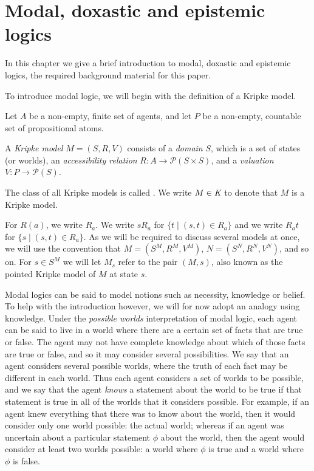 \chapter{Modal, doxastic and epistemic logics}\label{modal}

In this chapter we give a brief introduction to modal, doxastic and epistemic
logics, the required background material for this paper.

To introduce modal logic, we will begin with the definition of a Kripke model.

Let $A$ be a non-empty, finite set of agents, and let $P$ be a non-empty,
countable set of propositional atoms.

\begin{definition}
A \textit{Kripke model} $M = (S, R, V)$ consists of a \textit{domain} $S$, which
is a set of states (or worlds), an \textit{accessibility relation} $R : A \to
\mathcal{P}(S \times S)$, and a \textit{valuation} $V : P \to \mathcal{P}(S)$. 

The class of all Kripke models is called \classK{}. We write $M \in \textit{K}{}$
to denote that $M$ is a Kripke model.
\end{definition}

For $R(a)$, we write $R_a$. We write $sR_a$ for $\{t \mid (s, t) \in R_a\}$ and
we write $R_at$ for $\{s \mid (s, t) \in R_a\}$. As we will be required to
discuss several models at once, we will use the convention that $M = (S^M, R^M,
V^M)$, $N = (S^N, R^N, V^N)$, and so on. For $s \in S^M$ we will let $M_s$ refer
to the pair $(M, s)$, also known as the pointed Kripke model of $M$ at state
$s$.

Modal logics can be said to model notions such as necessity, knowledge or
belief. To help with the introduction however, we will for now adopt an analogy
using knowledge. Under the {\em possible worlds} interpretation of modal logic,
each agent can be said to live in a world where there are a certain set of facts
that are true or false. The agent may not have complete knowledge about which of
those facts are true or false, and so it may consider several possibilities. We
say that an agent considers several possible worlds, where the truth of each
fact may be different in each world. Thus each agent considers a set of worlds
to be possible, and we say that the agent {\em knows} a statement about the
world to be true if that statement is true in all of the worlds that it
considers possible. For example, if an agent knew everything that there was to
know about the world, then it would consider only one world possible: the actual
world; whereas if an agent was uncertain about a particular statement $\phi$
about the world, then the agent would consider at least two worlds possible: a
world where $\phi$ is true and a world where $\phi$ is false.

